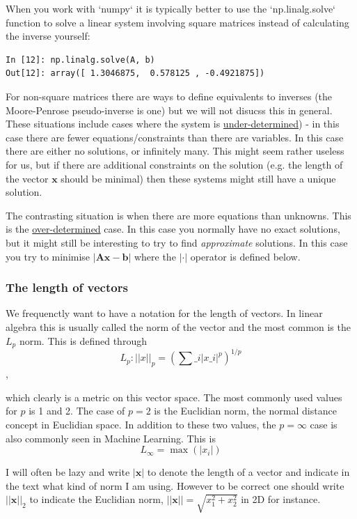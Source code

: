 \documentclass[a4paper,10pt]{article}
\begin{document}
When you work with `numpy` it is typically better to use the `np.linalg.solve` function to solve a linear system involving square matrices instead of calculating the inverse yourself:
\begin{lstlisting}
In [12]: np.linalg.solve(A, b)
Out[12]: array([ 1.3046875,  0.578125 , -0.4921875])
\end{lstlisting}

For non-square matrices there are ways to define equivalents to inverses (the Moore-Penrose pseudo-inverse is one) but we will not disucss this in general. These situations include cases where the system is \href{https://en.wikipedia.org/wiki/Underdetermined_system}{under-determined}) - in this case there are fewer equations/constraints than there are variables. In this case there are either no solutions, or infinitely many. This might seem rather useless for us, but if there are additional constraints on the solution (e.g. the length of the vector $\mathbf{x}$ should be minimal) then these systems might still have a unique solution.

The contrasting situation is when there are more equations than unknowns. This is the \href{https://en.wikipedia.org/wiki/Overdetermined_system}{over-determined}
 case. In this case you normally have no exact solutions, but it might still be interesting to try to find \textit{approximate} solutions. In this case you try to minimise $|\mathbf{A}\mathbf{x} - \mathbf{b}|$ where the $|\cdot|$ operator is defined below.

\subsubsection{ The length of vectors}

We frequenctly want to have a notation for the length of vectors. In linear algebra this is usually called the norm of the vector and the most common is the $L_p$ norm. This is defined through
$$L_p : ||x||_p = \left(\sum\_i \left|x\_i\right|^p\right)^{1/p} $$,

which clearly is a metric on this vector space. The most commonly used values for $p$ is 1 and 2. The case of $p=2$ is the Euclidian norm, the normal distance concept in Euclidian space. In addition to these two values, the $p=\infty$ case is also commonly seen in Machine Learning. This is
$$L_\infty = \max \left(|x_i|\right)$$

I will often be lazy and write $|\mathbf{x}|$ to denote the length of a vector and indicate in the text what kind of norm I am using. However to be correct one should write $||\mathbf{x}||_2$ to indicate the Euclidian norm, $||\mathbf{x}|| = \sqrt{x_1^2 + x_2^2}$ in 2D for instance.
\end{document}

